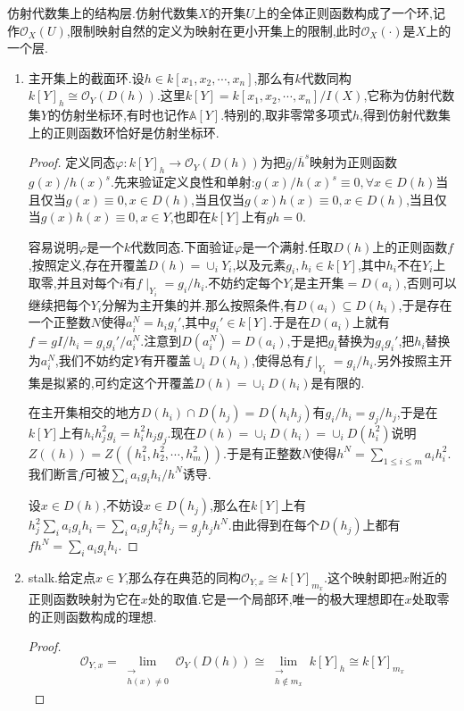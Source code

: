 仿射代数集上的结构层.仿射代数集$X$的开集$U$上的全体正则函数构成了一个环,记作$\mathscr{O}_X(U)$,限制映射自然的定义为映射在更小开集上的限制,此时$\mathscr{O}_X(\cdot)$是$X$上的一个层.
\begin{enumerate}
	\item 主开集上的截面环.设$h\in k[x_1,x_2,\cdots,x_n]$,那么有$k$代数同构$k[Y]_h\cong\mathscr{O}_Y(D(h))$.这里$k[Y]=k[x_1,x_2,\cdots,x_n]/I(X)$,它称为仿射代数集$Y$的仿射坐标环,有时也记作$\mathbb{A}[Y]$.特别的,取非零常多项式$h$,得到仿射代数集上的正则函数环恰好是仿射坐标环.
	\begin{proof}
		
		定义同态$\varphi:k[Y]_h\to\mathscr{O}_Y(D(h))$为把$\overline{g}/\overline{h}^s$映射为正则函数$g(x)/h(x)^s$.先来验证定义良性和单射:$g(x)/h(x)^s\equiv0,\forall x\in D(h)$当且仅当$g(x)\equiv0,x\in D(h)$,当且仅当$g(x)h(x)\equiv0,x\in D(h)$,当且仅当$g(x)h(x)\equiv0,x\in Y$,也即在$k[Y]$上有$gh=0$.
		
		容易说明$\varphi$是一个$k$代数同态.下面验证$\varphi$是一个满射.任取$D(h)$上的正则函数$f$,按照定义,存在开覆盖$D(h)=\cup_iY_i$,以及元素$g_i,h_i\in k[Y]$,其中$h_i$不在$Y_i$上取零,并且对每个$i$有$f\mid_{Y_i}=g_i/h_i$.不妨约定每个$Y_i$是主开集$=D(a_i)$,否则可以继续把每个$Y_i$分解为主开集的并.那么按照条件,有$D(a_i)\subseteq D(h_i)$,于是存在一个正整数$N$使得$a_i^N=h_ig_i'$,其中$g_i'\in k[Y]$.于是在$D(a_i)$上就有$f=gI/h_i=g_ig_i'/a_i^N$.注意到$D(a_i^N)=D(a_i)$,于是把$g_i$替换为$g_ig_i'$,把$h_i$替换为$a_i^N$,我们不妨约定$Y$有开覆盖$\cup_iD(h_i)$,使得总有$f\mid_{Y_i}=g_i/h_i$.另外按照主开集是拟紧的,可约定这个开覆盖$D(h)=\cup_iD(h_i)$是有限的.
		
		在主开集相交的地方$D(h_i)\cap D(h_j)=D(h_ih_j)$有$g_i/h_i=g_j/h_j$,于是在$k[Y]$上有$h_ih_j^2g_i=h_i^2h_jg_j$.现在$D(h)=\cup_iD(h_i)=\cup_iD(h_i^2)$说明$Z((h))=Z((h_1^2,h_2^2,\cdots,h_m^2))$.于是有正整数$N$使得$h^N=\sum_{1\le i\le m}a_ih_i^2$.我们断言$f$可被$\sum_ia_ig_ih_i/h^N$诱导.
		
		设$x\in D(h)$,不妨设$x\in D(h_j)$,那么在$k[Y]$上有$h_j^2\sum_ia_ig_ih_i=\sum_ia_ig_jh_i^2h_j=g_jh_jh^N$.由此得到在每个$D(h_j)$上都有$fh^N=\sum_ia_ig_ih_i$.
	\end{proof}
	\item stalk.给定点$x\in Y$,那么存在典范的同构$\mathscr{O}_{Y,x}\cong k[Y]_{m_x}$.这个映射即把$x$附近的正则函数映射为它在$x$处的取值.它是一个局部环,唯一的极大理想即在$x$处取零的正则函数构成的理想.
	\begin{proof}
		
		$$\mathscr{O}_{Y,x}=\lim\limits_{\substack{\rightarrow\\h(x)\not=0}}\mathscr{O}_Y(D(h))\cong\lim\limits_{\substack{\rightarrow\\h\not\in m_x}}k[Y]_h\cong k[Y]_{m_x}$$
	\end{proof}
\end{enumerate}

